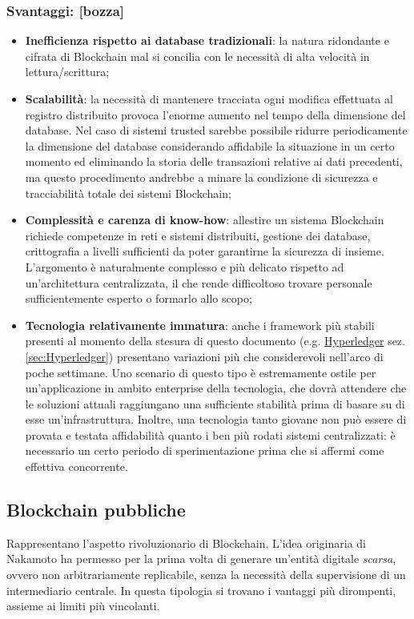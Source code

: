 		\subsubsection{Svantaggi: [bozza]}
			\begin{itemize}
				\item \textbf{Inefficienza rispetto ai database tradizionali}: la natura ridondante e cifrata di Blockchain mal si concilia con le necessità di alta velocità in lettura/scrittura;
				\item \textbf{Scalabilità}: la necessità di mantenere tracciata ogni modifica effettuata al registro distribuito provoca l'enorme aumento nel tempo della dimensione del database. Nel caso di sistemi trusted sarebbe possibile ridurre periodicamente la dimensione del database considerando affidabile la situazione in un certo momento ed eliminando la storia delle transazioni relative ai dati precedenti, ma questo procedimento andrebbe a minare la condizione di sicurezza e tracciabilità totale dei sistemi Blockchain;
				\item \textbf{Complessità e carenza di know-how}: allestire un sistema Blockchain richiede competenze in reti e sistemi distribuiti, gestione dei database, crittografia a livelli sufficienti da poter garantirne la sicurezza di insieme. L'argomento è naturalmente complesso e più delicato rispetto ad un'architettura centralizzata, il che rende difficoltoso trovare personale sufficientemente esperto o formarlo allo scopo;
				\item \textbf{Tecnologia relativamente immatura}: anche i framework più stabili presenti al momento della stesura di questo documento (e.g. \hyperref[sec:Hyperledger]{Hyperledger} sez. \ref{sec:Hyperledger}) presentano variazioni più che considerevoli nell'arco di poche settimane. Uno scenario di questo tipo è estremamente ostile per un'applicazione in ambito enterprise della tecnologia, che dovrà attendere che le soluzioni attuali raggiungano una sufficiente stabilità prima di basare su di esse un'infrastruttura. Inoltre, una tecnologia tanto giovane non può essere di provata e testata affidabilità quanto i ben più rodati sistemi centralizzati: è necessario un certo periodo di sperimentazione prima che si affermi come effettiva concorrente.
			\end{itemize}
		
	\subsection{Blockchain pubbliche}
		Rappresentano l'aspetto rivoluzionario di Blockchain. L'idea originaria di Nakamoto ha permesso per la prima volta di generare un'entità digitale \emph{scarsa}, ovvero non arbitrariamente replicabile, senza la necessità della supervisione di un intermediario centrale. In questa tipologia si trovano i vantaggi più dirompenti, assieme ai limiti più vincolanti.
